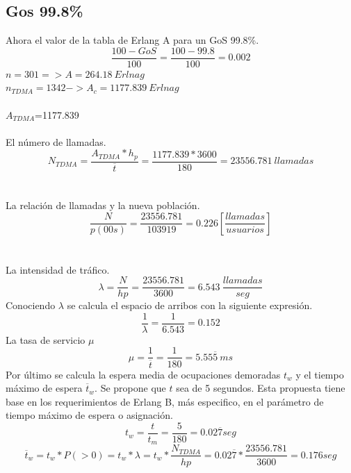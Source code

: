 \documentclass[11pt,letterpaper]{article}
\begin{document}
\subsection{Gos 99.8\%}
Ahora el valor de la tabla de Erlang A para un GoS 99.8\%.
\begin{equation}
    \frac{100-GoS}{100}=\frac{100-99.8}{100}=0.002
\end{equation}
$n=301 => A=264.18 \ Erlnag$
\\ 
$n_{TDMA}=1342->A_c=1177.839 \ Erlnag$
\\ \\
$A_{TDMA}$=1177.839
\\ \\
El número de llamadas.
\begin{equation}
    N_{TDMA}=\frac{A_{TDMA}*h_p}{\overline{t}}=\frac{1177.839*3600}{180}=23556.781 \ llamadas
\end{equation}
\\ \\
La relación de llamadas y la nueva población.
\begin{equation}
    \frac{N}{p(00s)}=\frac{23556.781}{103919}=0.226[\frac{llamadas}{usuarios}]
\end{equation}
\\ \\
La intensidad de tráfico.
\begin{equation}
    \lambda=\frac{N}{hp}=\frac{23556.781}{3600}=6.543 \ \frac{llamadas}{seg}
\end{equation}
Conociendo $\lambda$ se calcula el espacio de arribos con la siguiente expresión.
\begin{equation}
    \frac{1}{\lambda}=\frac{1}{6.543}=0.152 
\end{equation}
La tasa de servicio $\mu$
\begin{equation}
    \mu=\frac{1}{\overline{t}}=\frac{1}{180}=5.55\overline{5} \ ms
\end{equation}
Por último se calcula la espera media de ocupaciones demoradas $t_w$ y el tiempo máximo 
de espera $\overline{t}_w$. Se propone que $t$ sea de 5 segundos. Esta propuesta tiene base en los 
requerimientos de Erlang B, más especifico, en el parámetro de tiempo máximo de espera o 
asignación. 
\begin{equation}
    t_w=\frac{t}{t_m}=\frac{5}{180}=0.02\overline{7} seg
\end{equation}
\begin{equation}
    \overline{t}_w=t_w*P(>0)=t_w*\lambda=t_w*\frac{N_{TDMA}}{hp}=0.02\overline{7}*\frac{23556.781}{3600}=0.176seg
\end{equation}
\end{document}
